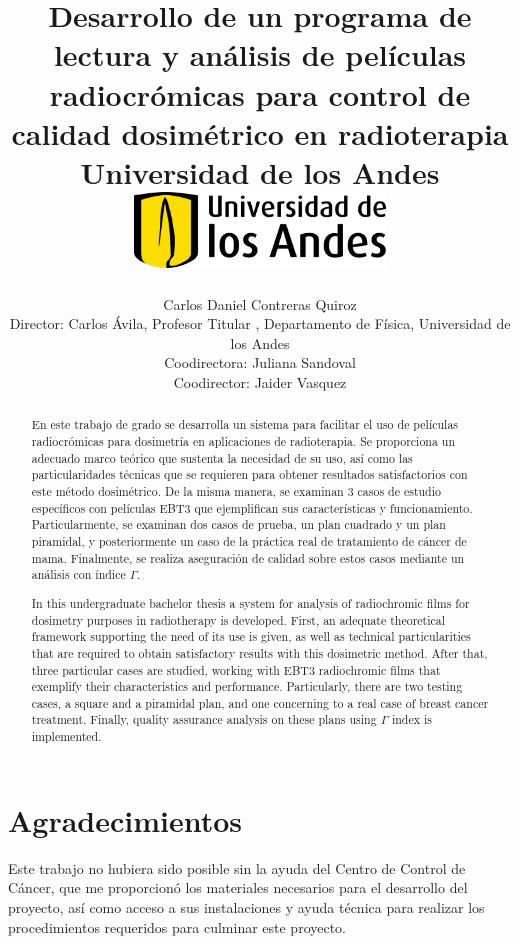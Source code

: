 \documentclass[12pt]{report}
\title 
{
	{Desarrollo de un programa de lectura y análisis de películas radiocrómicas para control de calidad dosimétrico en radioterapia}\\
	{\large Universidad de los Andes}\\
	\vspace{1.5cm}
	{\includegraphics[width = 0.5\textwidth]{logo.png}}	
}
\author{Carlos Daniel Contreras Quiroz\\[1cm]{\small Director: Carlos \'Avila, Profesor Titular , Departamento de Física, Universidad de los Andes}\\[1cm]{\small Coodirectora: Juliana Sandoval}\\[1cm]{\small Coodirector: Jaider Vasquez}}
\newenvironment{dedication}
  {\clearpage           %
   \thispagestyle{empty}%
   \vspace*{\stretch{1}}%
   \raggedleft          %
  }
  {\par %
   \vspace{\stretch{3}} %
   \clearpage           %
  }
\theoremstyle{definition}
\begin{document}

\maketitle


\begin{abstract}

En este trabajo de grado se desarrolla un sistema para facilitar el uso de películas radiocrómicas para dosimetría en aplicaciones de radioterapia. Se proporciona un adecuado marco teórico que sustenta la necesidad de su uso, así como las particularidades técnicas que se requieren para obtener resultados satisfactorios con este método dosimétrico. De la misma manera, se examinan 3 casos de estudio específicos con películas EBT3 que ejemplifican sus características y funcionamiento. Particularmente, se examinan dos casos de prueba, un plan cuadrado y un plan piramidal, y posteriormente un caso de la práctica real de tratamiento de cáncer de mama. Finalmente, se realiza aseguración de calidad sobre estos casos mediante un análisis con índice $\Gamma$.   

\end{abstract}

\begin{otherlanguage}{english}
	
\begin{abstract}
In this undergraduate bachelor thesis a system for analysis of radiochromic films for dosimetry purposes in radiotherapy is developed. First, an adequate theoretical framework supporting the need of its use is given, as well as technical particularities that are required to obtain satisfactory results with this dosimetric method. After that, three particular cases are studied, working with EBT3 radiochromic films that exemplify their characteristics and performance. Particularly, there are two testing cases, a square and a piramidal plan, and one concerning to a real case of  breast cancer treatment. Finally, quality assurance analysis on these plans using $\Gamma$ index is implemented. 

\end{abstract}
\end{otherlanguage}

\newpage

\chapter*{Agradecimientos}
Este trabajo no hubiera sido posible sin la ayuda del Centro de Control de Cáncer, que me proporcionó los materiales necesarios para el desarrollo del proyecto, así como acceso a sus instalaciones y ayuda técnica para realizar los procedimientos requeridos para culminar este proyecto.\\
\end{document}

